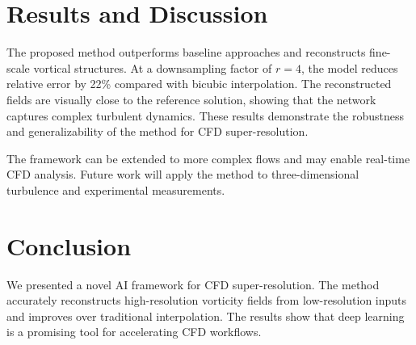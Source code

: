 \documentclass[11pt]{article}
\begin{document}
\section{Results and Discussion}
The proposed method outperforms baseline approaches and reconstructs fine-scale vortical structures. At a downsampling factor of $r=4$, the model reduces relative error by 22\% compared with bicubic interpolation. The reconstructed fields are visually close to the reference solution, showing that the network captures complex turbulent dynamics. These results demonstrate the robustness and generalizability of the method for CFD super-resolution.

The framework can be extended to more complex flows and may enable real-time CFD analysis. Future work will apply the method to three-dimensional turbulence and experimental measurements.

\section{Conclusion}
We presented a novel AI framework for CFD super-resolution. The method accurately reconstructs high-resolution vorticity fields from low-resolution inputs and improves over traditional interpolation. The results show that deep learning is a promising tool for accelerating CFD workflows.
\end{document}

